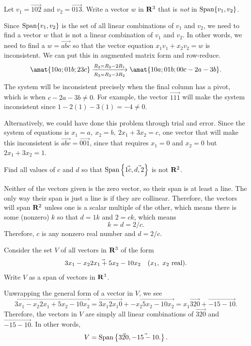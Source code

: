 \begin{problems}
\problem %
Let $v_1 = \vec{1 0 2}$ and $v_2 = \vec{0 1 3}$.  Write a vector $w$
in ${\bf R}^3$ that is \emph{not} in $\textup{Span}\{v_1, v_2\}$.

\begin{solution}
  Since $\textup{Span}\{v_1, v_2\}$ is the set of all linear
  combinations of $v_1$ and $v_2$, we need to find a vector $w$ that
  is not a linear combination of $v_1$ and $v_2$.  In other words, we
  need to find a $w = \vec{a b c}$ so that the vector equation
  $x_1v_1 + x_2 v_2 = w$ is inconsistent.  We can put this in
  augmented matrix form and row-reduce.
  \[\amat{1 0 a; 0 1 b; 2 3 c}
    \xrightarrow[R_3 = R_3 - 3R_2]{R_3 = R_3 - 2 R_1} \amat{1 0 a; 0 1
      b; 0 0 c-2a-3b}.\] %
  The system will be inconsistent precisely when the final column has
  a pivot, which is when $c - 2a - 3b \neq 0$.  For example, the
  vector $\vec{1 1 1}$ will make the system inconsistent since
  $1-2(1)-3(1) = -4 \neq 0$.
  
  Alternatively, we could have done this problem through trial and
  error.  Since the system of equations is
  $x_1 = a, \ x_2 = b, \ 2x_1 + 3x_2 = c$, one vector that will make
  this inconsistent is $\vec{a b c} = \vec{0 0 1}$, since that
  requires $x_1 = 0$ and $x_2 = 0$ but $2x_1 + 3x_2 = 1$.
\end{solution}

\problem Find all values of $c$ and $d$ so that
$\textup{Span}\left\{\vec{1 c}, \vec{d, 2}\right\}$ is not
${\bf R}^2$.

\begin{solution}
  Neither of the vectors given is the zero vector, so their span
  is at least a line.  The only way their span is just a line is if
  they are collinear.  Therefore, the vectors will span ${\bf R}^2$
  unless one is a scalar multiple of the other, which means there is
  some (nonzero) $k$ so that $d = 1k$ and $2 = ck$, which means
  \[k = d = 2/c.\]
  Therefore, $c$ is any nonzero real number and $d = 2/c$.
\end{solution}

\problem Consider the set $V$ of all vectors in ${\bf R}^3$ of the form
\[\vec{3x_1-x_2 2x_1+5x_2 -10x_2} \quad (x_1, \ x_2
  \textup{ real}).\] Write $V$ as a span of vectors in ${\bf R}^3$.

\begin{solution}
  Unwrapping the general form of a vector in $V$, we see
  \[\vec{3x_1-x_2 2x_1+5x_2 -10x_2} =
    \vec{3x_1 2x_1 0} + \vec{-x_2 5x_2 -10x_2}
    = x_1 \vec{3 2 0} + \vec{-1 5 -10}.\]
  Therefore, the vectors in $V$ are simply all linear combinations
  of $\vec{3 2 0}$ and $\vec{-1 5 -10}$.  In other words,
  \[V = \textup{Span}\left\{ \vec{3 2 0}, \vec{-1 5 -10}.\right\}.\]
\end{solution}

\end{problems}\setcounter{problem}{0}

